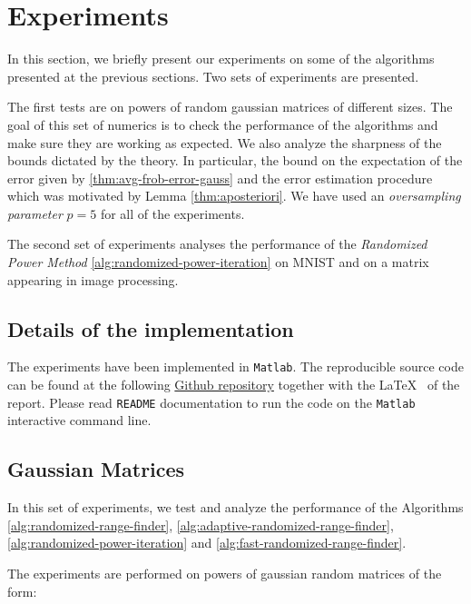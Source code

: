 \section{Experiments}
In this section, we briefly present our experiments on some of the 
algorithms presented at the previous sections. Two sets of experiments are presented.

The first tests are on powers
of random gaussian matrices of different sizes. The goal of this set of numerics
is to check the performance of the algorithms and make sure they are working
as expected. We also analyze the sharpness of the bounds dictated by the theory.
In particular, the bound on the expectation of the error given
by \ref{thm:avg-frob-error-gauss} and
the error estimation procedure which was motivated by 
Lemma \ref{thm:aposteriori}.
We have used an \textit{oversampling parameter} $p=5$ for all of the experiments.

The second set of experiments analyses the performance of the
\textit{Randomized Power Method} \ref{alg:randomized-power-iteration} on MNIST
and on a matrix appearing in image processing.

\subsection{Details of the implementation}
The experiments have been implemented in \verb|Matlab|. The reproducible
source code can be found at the following 
\href{https://github.com/alexnowakvila/ProbAlgosProj}{Github repository}
together with the \LaTeX~  of the report. Please read \verb|README| documentation
to run the code on the \verb|Matlab| interactive command line.
\subsection{Gaussian Matrices} \label{sec:gaussian-matrices}
In this set of experiments, we test and analyze the performance of the 
Algorithms \ref{alg:randomized-range-finder}, 
\ref{alg:adaptive-randomized-range-finder},
\ref{alg:randomized-power-iteration}
and \ref{alg:fast-randomized-range-finder}.

The experiments are performed on powers of gaussian random
matrices of the form:

